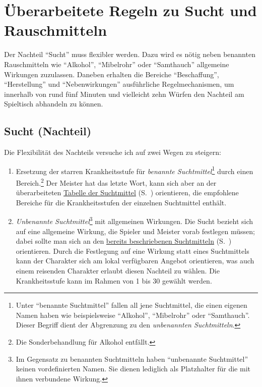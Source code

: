 \section{Überarbeitete Regeln zu Sucht und Rauschmitteln}
Der Nachteil \enquote{Sucht} muss flexibler werden. Dazu wird es nötig neben benannten Rauschmitteln wie \enquote{Alkohol}, \enquote{Mibelrohr} oder \enquote{Samthauch} allgemeine Wirkungen zuzulassen. Daneben erhalten die Bereiche \enquote{Beschaffung}, \enquote{Herstellung} und \enquote{Nebenwirkungen} ausführliche Regelmechanismen, um innerhalb von rund fünf Minuten und vielleicht zehn Würfen den Nachteil am Spieltisch abhandeln zu können.

\subsection{Sucht (Nachteil)}
Die Flexibilität des Nachteils versuche ich auf zwei Wegen zu steigern:
\begin{enumerate}
	\item Ersetzung der starren Krankheitsstufe für \emph{benannte Suchtmittel}\footnote{Unter \enquote{benannte Suchtmittel} fallen all jene Suchtmittel, die einen eigenen Namen haben wie beispielsweise \enquote{Alkohol}, \enquote{Mibelrohr} oder \enquote{Samthauch}. Dieser Begriff dient der Abgrenzung zu den \emph{unbenannten Suchtmitteln}.} durch einen Bereich.\footnote{Die Sonderbehandlung für Alkohol entfällt.} Der Meister hat das letzte Wort, kann sich aber an der überarbeiteten \hyperref[tbl-suchtmittel-revised]{Tabelle der Suchtmittel} (S.~\pageref{tbl-suchtmittel-revised}) orientieren, die empfohlene Bereiche für die Krankheitsstufen der einzelnen Suchtmittel enthält.
	\item \emph{Unbenannte Suchtmittel}\footnote{Im Gegensatz zu benannten Suchtmitteln haben \enquote{unbenannte Suchtmittel} keinen vordefinierten Namen. Sie dienen lediglich als Platzhalter für die mit ihnen verbundene Wirkung.} mit allgemeinen Wirkungen. Die Sucht bezieht sich auf eine allgemeine Wirkung, die Spieler und Meister vorab festlegen müssen; dabei sollte man sich an den \hyperref[tbl-suchtmittel]{bereits beschriebenen Suchtmitteln} (S.~\pageref{tbl-suchtmittel}) orientieren. Durch die Festlegung auf eine Wirkung statt eines Suchtmittels kann der Charakter sich am lokal verfügbaren Angebot orientieren, was auch einem reisenden Charakter erlaubt diesen Nachteil zu wählen. Die Krankheitsstufe kann im Rahmen von 1 bis 30 gewählt werden.
\end{enumerate}

